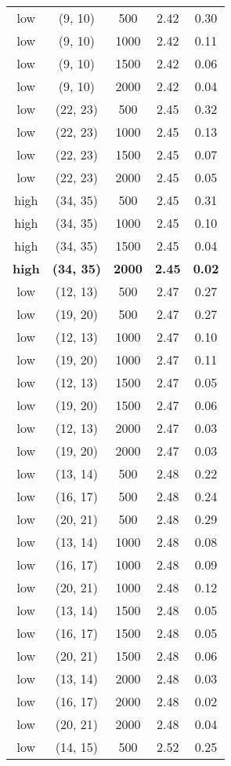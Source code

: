 \begin{tabular}{c c c c c}
low & (9, 10) &  500 & 2.42 & 0.30 \\
low & (9, 10) &  1000 & 2.42 & 0.11 \\
low & (9, 10) &  1500 & 2.42 & 0.06 \\
low & (9, 10) &  2000 & 2.42 & 0.04 \\
low & (22, 23) &  500 & 2.45 & 0.32 \\
low & (22, 23) &  1000 & 2.45 & 0.13 \\
low & (22, 23) &  1500 & 2.45 & 0.07 \\
low & (22, 23) &  2000 & 2.45 & 0.05 \\
high & (34, 35) &  500 & 2.45 & 0.31 \\
high & (34, 35) &  1000 & 2.45 & 0.10 \\
high & (34, 35) &  1500 & 2.45 & 0.04 \\
\textbf{high} & \textbf{(34, 35)} & \textbf{ 2000} & \textbf{2.45} & \textbf{0.02} \\
low & (12, 13) &  500 & 2.47 & 0.27 \\
low & (19, 20) &  500 & 2.47 & 0.27 \\
low & (12, 13) &  1000 & 2.47 & 0.10 \\
low & (19, 20) &  1000 & 2.47 & 0.11 \\
low & (12, 13) &  1500 & 2.47 & 0.05 \\
low & (19, 20) &  1500 & 2.47 & 0.06 \\
low & (12, 13) &  2000 & 2.47 & 0.03 \\
low & (19, 20) &  2000 & 2.47 & 0.03 \\
low & (13, 14) &  500 & 2.48 & 0.22 \\
low & (16, 17) &  500 & 2.48 & 0.24 \\
low & (20, 21) &  500 & 2.48 & 0.29 \\
low & (13, 14) &  1000 & 2.48 & 0.08 \\
low & (16, 17) &  1000 & 2.48 & 0.09 \\
low & (20, 21) &  1000 & 2.48 & 0.12 \\
low & (13, 14) &  1500 & 2.48 & 0.05 \\
low & (16, 17) &  1500 & 2.48 & 0.05 \\
low & (20, 21) &  1500 & 2.48 & 0.06 \\
low & (13, 14) &  2000 & 2.48 & 0.03 \\
low & (16, 17) &  2000 & 2.48 & 0.02 \\
low & (20, 21) &  2000 & 2.48 & 0.04 \\
low & (14, 15) &  500 & 2.52 & 0.25 \\

\end{tabular}
